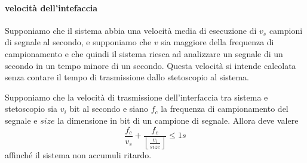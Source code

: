 \paragraph{velocit\`a dell'intefaccia}

Supponiamo che il sistema abbia una velocit\`a media di esecuzione di $v_{s}$ campioni di segnale al secondo, e supponiamo che $v$ sia maggiore della frequenza di campionamento e che quindi il sistema riesca ad analizzare un segnale di un secondo in un tempo minore di un secondo. Questa velocit\`a si intende calcolata senza contare il tempo di trasmissione dallo stetoscopio al sistema.

Supponiamo che la velocit\`a di trasmissione dell'interfaccia tra sistema e stetoscopio sia $v_{i}$ bit al secondo e siano $f_{c}$ la frequenza di campionamento del segnale e $size$ la dimensione in bit di un campione di segnale. Allora deve valere
\[
  \displaystyle  \frac{f_{c}}{v_{s}} + \displaystyle \frac{f_{c}}{\left\lfloor\frac{v_{i}}{size}\right\rfloor} \leq 1s
\]
affinch\'e il sistema non accumuli ritardo.









